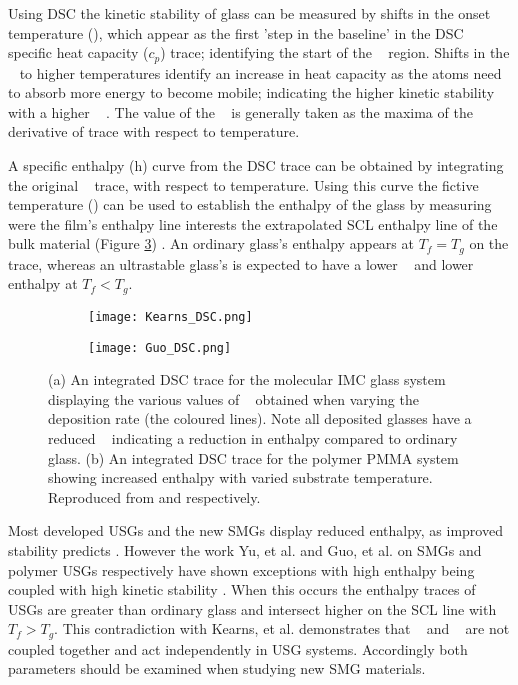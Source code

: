 \documentclass[draft,a4paper,12pt,oneside]{report}%
\begin{document}
Using DSC the kinetic stability of glass can be measured by shifts in the onset temperature (\Tonset), which appear as the first 'step in the baseline' in the DSC specific heat capacity ($c_{p}$) trace; identifying the start of the \Tg~ region. Shifts in the \Tonset~ to higher temperatures identify an increase in heat capacity as the atoms need to absorb more energy to become mobile; indicating the higher kinetic stability with a higher \Tg~ \cite{Kearns2008}. The value of the \Tg~ is generally taken as the maxima of the derivative of trace with respect to temperature.

A specific enthalpy (h) curve from the DSC trace can be obtained by integrating the original \Cp~ trace, with respect to temperature. Using this curve the  fictive temperature (\Tf) can be used to establish the enthalpy of the glass  by measuring were the film's enthalpy line interests the extrapolated SCL enthalpy line of the bulk material (Figure \ref{fig:DSC_IMC_PMMA}) \cite{Kearns2008}. An ordinary glass's enthalpy appears at $T_{f} = T_{g}$ on the trace, whereas an ultrastable glass's is expected to have a lower \Tf~ and lower enthalpy at $T_{f} < T_{g}$.  

\begin{figure}[bp]
	\centering
	\begin{subfigure}[htbp]{0.75\textwidth}
		\texttt{[image: Kearns\_DSC.png]}
		\caption{}
		\label{fig:DSC_IMC}
	\end{subfigure}
	\begin{subfigure}[htbp]{0.75\textwidth}
		\texttt{[image: Guo\_DSC.png]}
		\caption{}
		\label{fig:DSC_PMMA}
	\end{subfigure}
	\caption[General USG DSC]{(a) An integrated DSC trace for the molecular  IMC glass system displaying the various values of \Tf~ obtained when varying the deposition rate (the coloured lines). Note all deposited glasses have a reduced \Tf~ indicating a reduction in enthalpy compared to ordinary glass. (b) An integrated DSC trace for the polymer PMMA system showing increased enthalpy with varied substrate temperature. Reproduced from \cite{Kearns2008} and \cite{Guo2012} respectively.}%
	\label{fig:DSC_IMC_PMMA}
\end{figure}

Most developed USGs and the new SMGs display reduced enthalpy, as improved stability predicts \cite{Aji2013, Wang2014}. However the work Yu, et al. \cite{Yu2013} and Guo, et al. \cite{Guo2012} on SMGs and polymer USGs respectively have shown exceptions with high enthalpy being coupled with high kinetic stability \dTg. When this occurs the enthalpy traces of USGs are greater than ordinary glass and intersect higher on the SCL line with $T_{f} > T_{g}$.  This contradiction with Kearns, et al. \cite{Kearns2008} demonstrates that \Tonset~ and \Tf~ are not coupled together and act independently in USG systems. Accordingly both parameters should be examined when studying new SMG materials. 
\end{document}

